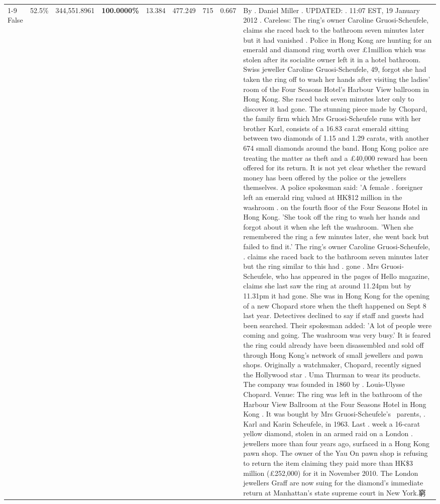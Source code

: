 \begin{table}[H]
\begin{tabular}{lllrlllll}
\cline{1-9}
False & 52.5\% & 344,551.8961 & \bfseries \color{red} 100.0000\% & 13.384 & 477.249 & 715 & 0.667 & By . Daniel Miller . UPDATED: . 11:07 EST, 19 January 2012 . Careless: The ring's owner Caroline Gruosi-Scheufele, claims she raced back to the bathroom seven minutes later but it had vanished . Police in Hong Kong are hunting for an emerald and diamond ring worth over £1million which was stolen after its socialite owner left it in a hotel bathroom. Swiss jeweller Caroline Gruosi-Scheufele, 49, forgot she had taken the ring off to wash her hands after visiting the ladies' room of the Four Seasons Hotel's Harbour View ballroom in Hong Kong. She raced back seven minutes later only to discover it had gone. The stunning piece made by Chopard, the family firm which Mrs Gruosi-Scheufele runs with her brother Karl, consists of a 16.83 carat emerald sitting between two diamonds of 1.15 and 1.29 carats, with another 674 small diamonds around the band. Hong Kong police are treating the matter as theft and a £40,000 reward has been offered for its return. It is not yet clear whether the reward money has been offered by the police or the jewellers themselves. A police spokesman said: 'A female . foreigner left an emerald ring valued at HK\$12 million in the washroom . on the fourth floor of the Four Seasons Hotel in Hong Kong. 'She took off the ring to wash her hands and forgot about it when she left the washroom. 'When she remembered the ring a few minutes later, she went back but failed to find it.' The ring's owner Caroline Gruosi-Scheufele, . claims she raced back to the bathroom seven minutes later but the ring similar to this had . gone . Mrs Gruosi-Scheufele, who has appeared in the pages of Hello magazine, claims she last saw the ring at around 11.24pm but by 11.31pm it had gone. She was in Hong Kong for the opening of a new Chopard store when the theft happened on Sept 8 last year. Detectives declined to say if staff and guests had been searched. Their spokesman added: 'A lot of people were coming and going. The washroom was very busy.' It is feared the ring could already have been disassembled and sold off through Hong Kong's network of small jewellers and pawn shops. Originally a watchmaker, Chopard, recently signed the Hollywood star . Uma Thurman to wear its products. The company was founded in 1860 by . Louis-Ulysse Chopard. Venue: The ring was left in the bathroom of the Harbour View Ballroom at the Four Seasons Hotel in Hong Kong . It was bought by Mrs Gruosi-Scheufele's  parents, . Karl and Karin Scheufele, in 1963. Last . week a 16-carat yellow diamond, stolen in an armed raid on a London . jewellers more than four years ago, surfaced in a Hong Kong pawn shop. The owner of the Yau On pawn shop is refusing to return the item claiming they paid more than HK\$3 million (£252,000) for it in November 2010. The London jewellers Graff are now suing for the diamond’s immediate return at Manhattan’s state supreme court in New York.窮 \\

\end{tabular}
\end{table}
